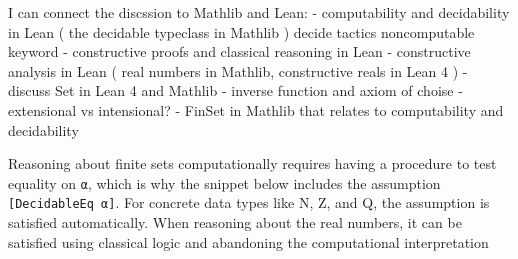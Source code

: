 I can connect the discssion to Mathlib and Lean:
 - computability and decidability in Lean ( the decidable typeclass in Mathlib )
 decide tactics noncomputable keyword
  - constructive proofs and classical reasoning in Lean
  - constructive analysis in Lean ( real numbers in Mathlib, constructive reals in Lean 4 )
  - discuss Set in Lean 4 and Mathlib 
  - inverse function and axiom of choise
  - extensional vs intensional?
  - FinSet in Mathlib that relates to computability and decidability

Reasoning about finite sets computationally requires having a procedure to test equality
on \lstinline[language=lean]|α|, which is why the snippet below 
includes the assumption \lstinline[language=lean]|[DecidableEq α]|. 
For concrete data types like N, Z,
and Q, the assumption is satisfied automatically. 
When reasoning about the real numbers, it can be satisfied using classical
logic and abandoning the computational interpretation